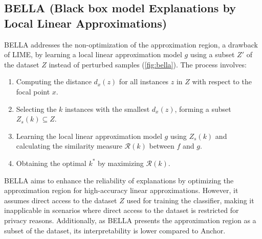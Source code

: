 \documentclass[runningheads]{llncs}
\begin{document}
\subsection{BELLA (Black box model Explanations by Local Linear Approximations) \cite{radulovic2023bella}}
BELLA addresses the non-optimization of the approximation region, a drawback of LIME, by learning a local linear approximation model $g$ using a subset $Z'$ of the dataset $Z$ instead of perturbed samples (\cref{fig:bella}). The process involves:
\begin{enumerate}
  \item Computing the distance $d_x(z)$ for all instances $z$ in $Z$ with respect to the focal point $x$.
  \item Selecting the $k$ instances with the smallest $d_x(z)$, forming a subset $Z_s(k) \subseteq Z$.
  \item Learning the local linear approximation model $g$ using $Z_s(k)$ and calculating the similarity measure $\mathcal{R}(k)$ between $f$ and $g$.
  \item Obtaining the optimal $k^*$ by maximizing $\mathcal{R}(k)$.
\end{enumerate}

BELLA aims to enhance the reliability of explanations by optimizing the approximation region for high-accuracy linear approximations. However, it assumes direct access to the dataset $Z$ used for training the classifier, making it inapplicable in scenarios where direct access to the dataset is restricted for privacy reasons. Additionally, as BELLA presents the approximation region as a subset of the dataset, its interpretability is lower compared to Anchor.
\end{document}
